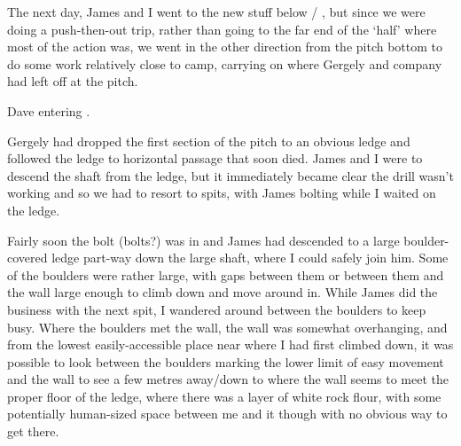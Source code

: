 The next day, James and I went to the new stuff below
 / , but since we were doing a push-then-out
trip, rather than going to the far end of the `half' where most of the
action was, we went in the other direction from the pitch bottom to do
some work relatively close to camp, carrying on where Gergely and company had
left off at the  pitch.

    \begin{marginfigure}
\checkoddpage \ifoddpage \forcerectofloat \else \forceversofloat \fi
\centering
 \caption{Dave entering \protect{}. }
 \label{dw gw}
\end{marginfigure}

Gergely had dropped the first section of the pitch to an obvious ledge
and followed the ledge to horizontal passage that soon died. James and I
were to descend the shaft from the ledge, but it immediately became
clear the drill wasn't working and so we had to resort to spits, with
James bolting while I waited on the ledge.

Fairly soon the bolt (bolts?) was in and James had descended to a large
boulder-covered ledge part-way down the large shaft, where I could
safely join him. Some of the boulders were rather large, with gaps
between them or between them and the wall large enough to climb down and
move around in. While James did the business with the next spit, I
wandered around between the boulders to keep busy. Where the boulders
met the wall, the wall was somewhat overhanging, and from the lowest
easily-accessible place near where I had first climbed down, it was
possible to look between the boulders marking the lower limit of easy
movement and the wall to see a few metres away/down to where the wall
seems to meet the proper floor of the ledge, where there was a layer of
white rock flour, with some potentially human-sized space between me and
it though with no obvious way to get there.



